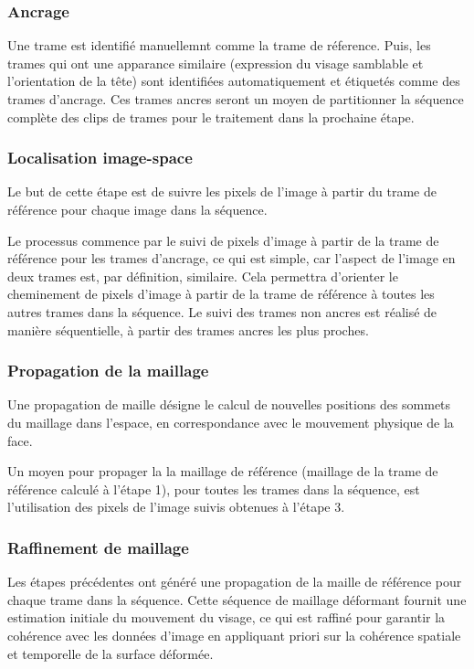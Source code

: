 \documentclass[a4paper,10pt]{article}
\begin{document}
\subsubsection{Ancrage}
Une trame est identifié manuellemnt comme la trame de réference. Puis, les trames qui ont une apparance similaire (expression du visage samblable et l'orientation de la tête) sont identifiées automatiquement et étiquetés comme des trames d'ancrage. Ces trames ancres seront un moyen de partitionner la séquence complète des clips de trames pour le traitement dans la prochaine étape.

\subsubsection{Localisation image-space}
Le but de cette étape est de suivre les pixels de l'image à partir du trame de référence pour chaque image dans la séquence. 

Le processus commence par le suivi de pixels d'image à partir de la trame de référence pour les trames d'ancrage, ce qui est simple, car l'aspect de l'image en deux trames est, par définition, similaire. Cela permettra d'orienter le cheminement de pixels d'image à partir de la trame de référence à toutes les autres trames dans la séquence. 
Le suivi des trames non ancres est réalisé de manière séquentielle, à partir des trames ancres les plus proches.

\subsubsection{Propagation de la maillage}

Une propagation de maille désigne le calcul de nouvelles positions des sommets du maillage dans l'espace, en correspondance avec le mouvement physique de la face.

Un moyen pour propager la la maillage de référence (maillage de la trame de référence calculé à l'étape 1), pour toutes les trames dans la séquence, est l'utilisation des pixels de l'image suivis obtenues à l'étape 3.
 
\subsubsection{Raffinement de maillage}

Les étapes précédentes ont généré une propagation de la maille de référence pour chaque trame dans la séquence. Cette séquence de maillage déformant fournit une estimation initiale du mouvement du visage, ce qui est raffiné pour garantir la cohérence avec les données d'image en appliquant priori sur la cohérence spatiale et temporelle de la surface déformée.
\end{document}
